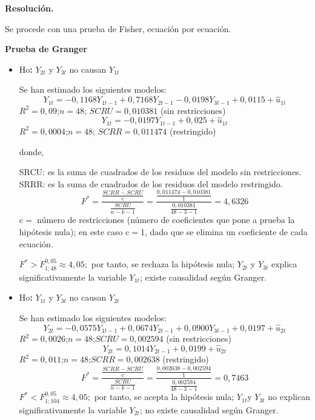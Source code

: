 \textbf{Resoluci\'{o}n.}\newline

Se procede con una prueba de Fisher, ecuaci\'{o}n por ecuaci\'{o}n.\newline

\textbf{Prueba de Granger}\newline

\begin{itemize}
      \item Ho\textbf{: }$Y_{2t}$ y $Y_{3t}$ no causan $Y_{1t}$

Se han estimado los siguientes modelos:
\[
Y_{1t}=-0,1168Y_{1t-1}+0,7168Y_{2t-1}-0,0198Y_{3t-1}+0,0115+\hat{u}_{1t}
\]
$R^{2}=0,09$;\quad $n=48$; $SCRU=0,010381$ (sin restricciones)
\[
Y_{1t}=-0,0197Y_{1t-1}+0,025+\hat{u}_{1t}
\]
$R^{2}=0,0004$;\quad $n=48$; \quad $SCRR=0,011474$ (restringido)

donde,

SRCU: es la suma de cuadrados de los residuos del modelo sin restricciones.\newline
SRRR: es la suma de cuadrados de los residuos del modelo restringido.
\[
F^{\ast }=\frac{\frac{SCRR-SCRU}{c}}{\frac{SCRU}{n-k-1}}=\frac{\frac{\mathrm{0,011474-0,010381}}{1}}{\frac{\mathrm{0,010381}}{48-3-1}}=4,6326
\]
c$=$ n\'{u}mero de restricciones (n\'{u}mero de coeficientes que pone a prueba la hip\'{o}tesis nula); en este caso c$=$1, dado que se elimina un coeficiente de cada ecuaci\'{o}n.\newline

$F^{\ast }>F_{1;48}^{0,05}\approx 4,05;$ por tanto, se rechaza la hip\'{o}tesis nula; $Y_{2t}$ y $Y_{3t}$ explica significativamente la variable $Y_{1t}$; existe causalidad seg\'{u}n Granger.

      \item Ho\textbf{: }$Y_{1t}$ y $Y_{3t}$ no causan $Y_{2t}$

Se han estimado los siguientes modelos: 
\[
Y_{2t}=-0,0575Y_{1t-1}+0,0674Y_{2t-1}+0,0900Y_{3t-1}+0,0197+\hat{u}_{2t}
\]
$R^{2}=0,0026$;\quad $n=48$;\quad $SCRU=0,002594$ (sin restricciones)
\[
Y_{2t}=0,1014Y_{2t-1}+0,0199+\hat{u}_{2t}
\]
$R^{2}=0,011$;\quad $n=48$;\quad $SCRR=0,002638$ (restringido)
\[
F^{\ast }=\frac{\frac{SCRR-SCRU}{c}}{\frac{SCRU}{n-k-1}}=\frac{\frac{0,002638-\mathrm{0,002594}}{1}}{\frac{\mathrm{0,002594}}{48-3-1}}=0,7463
\]
$F^{\ast }<F_{1;104}^{0,05}\approx 4,05;$ por tanto, se acepta la hip\'{o}tesis nula; $Y_{1t}$y $Y_{3t}$ no explican significativamente la variable $Y_{2t}$; no existe causalidad seg\'{u}n Granger.


\end{itemize}
